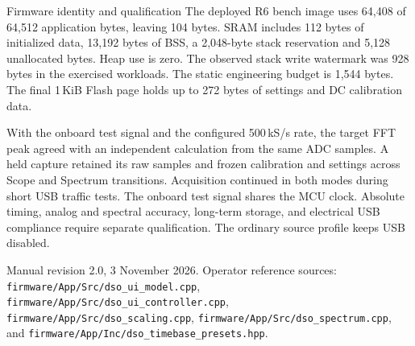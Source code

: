 \documentclass[10pt,a4paper]{article}
\begin{document}
\begin{manualnote}{Firmware identity and qualification}
The deployed R6 bench image uses 64,408 of 64,512 application bytes, leaving 104 bytes. SRAM includes 112 bytes of initialized data, 13,192 bytes of BSS, a 2,048-byte stack reservation and 5,128 unallocated bytes. Heap use is zero. The observed stack write watermark was 928 bytes in the exercised workloads. The static engineering budget is 1,544 bytes. The final 1\,KiB Flash page holds up to 272 bytes of settings and DC calibration data.

With the onboard test signal and the configured 500\,kS/s rate, the target FFT peak agreed with an independent calculation from the same ADC samples. A held capture retained its raw samples and frozen calibration and settings across Scope and Spectrum transitions. Acquisition continued in both modes during short USB traffic tests. The onboard test signal shares the MCU clock. Absolute timing, analog and spectral accuracy, long-term storage, and electrical USB compliance require separate qualification. The ordinary source profile keeps USB disabled.
\end{manualnote}

  \vfill
  \begin{center}\footnotesize Manual revision 2.0, 3 November 2026. Operator reference sources: \texttt{firmware/App/Src/dso\_ui\_model.cpp}, \texttt{firmware/App/Src/dso\_ui\_controller.cpp}, \texttt{firmware/App/Src/dso\_scaling.cpp}, \texttt{firmware/App/Src/dso\_spectrum.cpp}, and \texttt{firmware/App/Inc/dso\_timebase\_presets.hpp}.\end{center}
\end{document}
